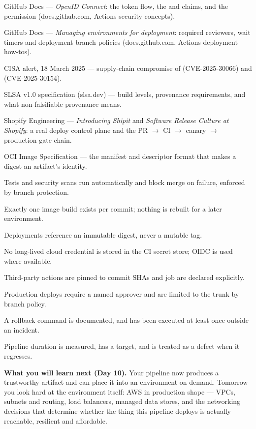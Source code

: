 \begin{wbitem}
  \item GitHub Docs --- \emph{OpenID Connect}: the token flow, the  and  claims, and the  permission (docs.github.com, Actions security concepts).
  \item GitHub Docs --- \emph{Managing environments for deployment}: required reviewers, wait timers and deployment branch policies (docs.github.com, Actions deployment how-tos).
  \item CISA alert, 18 March 2025 --- supply-chain compromise of  (CVE-2025-30066) and  (CVE-2025-30154).
  \item SLSA v1.0 specification (slsa.dev) --- build levels, provenance requirements, and what non-falsifiable provenance means.
  \item Shopify Engineering --- \emph{Introducing Shipit} and \emph{Software Release Culture at Shopify}: a real deploy control plane and the PR $\rightarrow$ CI $\rightarrow$ canary $\rightarrow$ production gate chain.
  \item OCI Image Specification --- the manifest and descriptor format that makes a digest an artifact's identity.
\end{wbitem}

\begin{checklist}
  \item Tests and security scans run automatically and block merge on failure, enforced by branch protection.
  \item Exactly one image build exists per commit; nothing is rebuilt for a later environment.
  \item Deployments reference an immutable digest, never a mutable tag.
  \item No long-lived cloud credential is stored in the CI secret store; OIDC is used where available.
  \item Third-party actions are pinned to commit SHAs and job  are declared explicitly.
  \item Production deploys require a named approver and are limited to the trunk by branch policy.
  \item A rollback command is documented, and has been executed at least once outside an incident.
  \item Pipeline duration is measured, has a target, and is treated as a defect when it regresses.
\end{checklist}

\begin{keyidea}
\textbf{What you will learn next (Day 10).} Your pipeline now produces a trustworthy artifact and can place it into an environment on demand. Tomorrow you look hard at the environment itself: AWS in production shape --- VPCs, subnets and routing, load balancers, managed data stores, and the networking decisions that determine whether the thing this pipeline deploys is actually reachable, resilient and affordable.
\end{keyidea}
